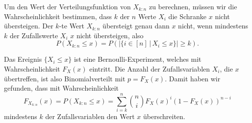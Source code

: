 Um den Wert der Verteilungsfunktion von $X_{k:n}$ zu berechnen, müssen wir 
die Wahrscheinlichkeit bestimmen, dass $k$ der $n$ Werte $X_i$
die Schranke $x$ nicht übersteigen.
Der $k$-te Wert $X_{k:n}$ übersteigt genau dann $x$ nicht, wenn
mindestens $k$ der Zufallswerte $X_i$ $x$ nicht übersteigen, also
\[
P(X_{k:n} \le x)
=
P\left(
|\{i\in[n]\,|\, X_i\le x\}| \ge k
\right).
\]

Das Ereignis $\{X_i\le x\}$ ist eine Bernoulli-Experiment, welches mit
Wahrscheinlichkeit $F_X(x)$ eintritt.
Die Anzahl der Zufallsvariablen $X_i$, die $x$ übertreffen, ist also
Binomialverteilt mit $p=F_X(x)$.
Damit haben wir gefunden, dass mit Wahrscheinlichkeit
\begin{equation}
F_{X_{k:n}}(x)
=
P(X_{k:n}\le x)
=
\sum_{i=k}^n \binom{n}{i}F_X(x)^i (1-F_X(x))^{n-i}
\label{buch:rekursion:ordnung:eqn:FXkn}
\end{equation}
mindestens $k$ der Zufallsvariablen den Wert $x$ überschreiten.

